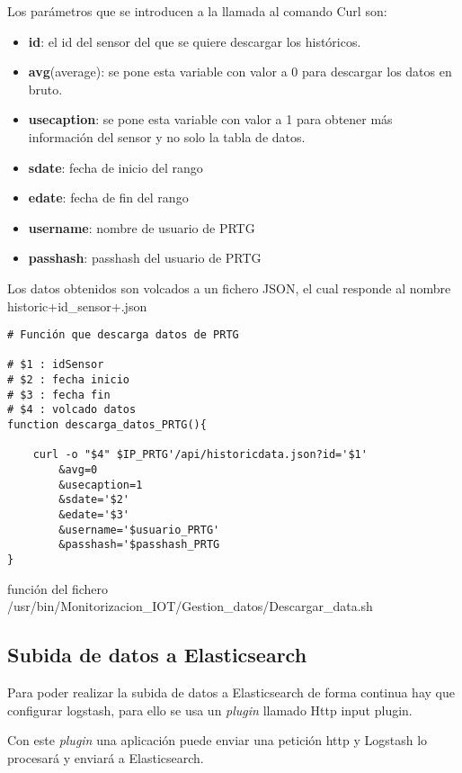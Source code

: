 Los parámetros que se introducen a la llamada al comando Curl son:
\begin{itemize}
    \item \textbf{id}: el id del sensor del que se quiere descargar los históricos.
    \item \textbf{avg}(average): se pone esta variable con valor a 0 para descargar los datos en bruto.
    \item \textbf{usecaption}: se pone esta variable con valor a 1 para obtener más información del sensor y no solo la tabla de datos.
    \item \textbf{sdate}: fecha de inicio del rango
    \item \textbf{edate}: fecha de fin del rango
    \item \textbf{username}: nombre de usuario de PRTG
    \item \textbf{passhash}: passhash del usuario de PRTG
\end{itemize}


Los datos obtenidos son volcados a un fichero JSON, el cual responde al nombre historic+id\_sensor+.json


 \begin{verbatim}    
# Función que descarga datos de PRTG

# $1 : idSensor
# $2 : fecha inicio
# $3 : fecha fin
# $4 : volcado datos
function descarga_datos_PRTG(){

    curl -o "$4" $IP_PRTG'/api/historicdata.json?id='$1'
        &avg=0
        &usecaption=1
        &sdate='$2'
        &edate='$3'
        &username='$usuario_PRTG'
        &passhash='$passhash_PRTG
}
\end{verbatim}   
\caption{función del fichero 
/usr/bin/Monitorizacion\_IOT/Gestion\_datos/Descargar\_data.sh}    


\subsection{Subida de datos a Elasticsearch}
    
Para poder realizar la subida de datos a Elasticsearch de forma continua hay que configurar logstash, para ello se usa un \textit{plugin} llamado Http input plugin. 

Con este \textit{plugin} una aplicación puede enviar una petición http y Logstash lo procesará y enviará a Elasticsearch.\cite{pagina:Http_plugin_input}

